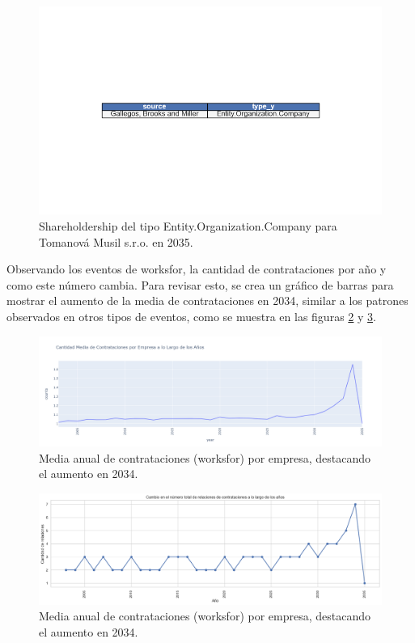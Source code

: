 \documentclass[11pt,spanish,a4paper]{article}
\begin{document}
\begin{figure}[H]
  \centering
  \includegraphics[width=0.7\linewidth]{graphs/entity_company_shareholder_tomanova.png}
  \caption{Shareholdership del tipo Entity.Organization.Company para Tomanová Musil s.r.o. en 2035.}
  \label{fig:entity_company_shareholder_tomanova}
\end{figure}


Observando los eventos de worksfor, la cantidad de contrataciones por año y como este número cambia. Para revisar esto, se crea un gráfico de barras para mostrar el aumento de la media de contrataciones en 2034, similar a los patrones observados en otros tipos de eventos, como se muestra en las figuras \ref{fig:contrataciones_2001_2035} y \ref{fig:contrataciones_2001_2035_v2}.

\begin{figure}[H]
  \centering
  \includegraphics[width=0.7\linewidth]{graphs/promedio_cambio_contrataciones.png}
  \caption{Media anual de contrataciones (worksfor) por empresa, destacando el aumento en 2034.}
  \label{fig:contrataciones_2001_2035}
\end{figure}

\begin{figure}[H]
  \centering
  \includegraphics[width=0.7\linewidth]{graphs/promedio_cambio_contrataciones_v2.png}
  \caption{Media anual de contrataciones (worksfor) por empresa, destacando el aumento en 2034.}
  \label{fig:contrataciones_2001_2035_v2}
\end{figure}
\end{document}
